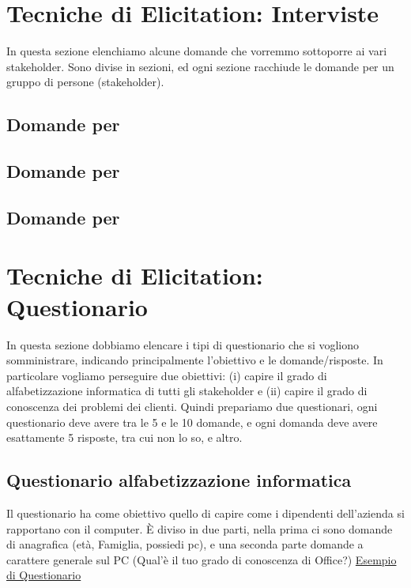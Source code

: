 \documentclass[11pt]{article}
\newcommand{\rosso}[1]{\color[rgb]{1,0,0}{#1}}
\newcommand{\blu}[1]{\color[rgb]{0,0,1}{#1}}
\newcommand{\verde}[1]{\color[rgb]{0,0.65,0.31}{#1}}
\newcommand{\nero}[1]{\color[rgb]{0,0,0}{#1}}
\begin{document}
\section{Tecniche di Elicitation: Interviste}
In questa sezione elenchiamo alcune domande che vorremmo sottoporre ai
vari stakeholder. Sono divise in sezioni, ed ogni sezione racchiude le
domande per un gruppo di persone (stakeholder).

\subsection{Domande per \blu{Segretaria}}



\subsection{Domande per \verde{Artigiano}}


\subsection{Domande per \rosso{Cliente} \nero{che apre una richiesta}}


\section{Tecniche di Elicitation: Questionario}
In questa sezione dobbiamo elencare i tipi di questionario che si
vogliono somministrare, indicando principalmente l'obiettivo e le
domande/risposte. In particolare vogliamo perseguire due obiettivi:
(i) capire il grado di alfabetizzazione informatica di tutti gli
stakeholder e (ii) capire il grado di conoscenza dei problemi dei
clienti.  Quindi prepariamo due questionari, ogni questionario deve
avere tra le 5 e le 10 domande, e ogni domanda deve avere esattamente
5 risposte, tra cui non lo so, e altro.

\subsection{Questionario alfabetizzazione informatica}
Il questionario ha come obiettivo quello di capire come i dipendenti
dell'azienda si rapportano con il computer.  \`E diviso in due parti,
nella prima ci sono domande di anagrafica (et\`a, Famiglia, possiedi
pc), e una seconda parte domande a carattere generale sul PC (Qual'\`e
il tuo grado di conoscenza di Office?)
\href{http://www00.unibg.it/dati/bacheca/313/9143.pdf}{Esempio di Questionario}
\end{document}

